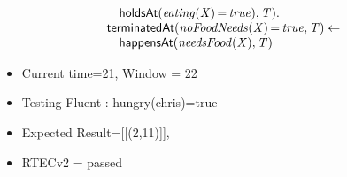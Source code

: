 \documentclass[8pt]{beamer}
\DeclareMathOperator{\val}{=}  %
\def \patsize {}
\def\happensAt{\textsf{\patsize happensAt}}
\def\holdsAt{\textsf{\patsize holdsAt}}
\def\terminatedAt{\textsf{\patsize terminatedAt}}
\newenvironment{mysplit}%
  {\arraycolsep 0pt \begin{array}{l}}%
  {\end{array}}
\begin{document}
\begin{frame}
\begin{minipage}{0.55\linewidth}
\begin{align*}
\begin{mysplit}
                \quad    \holdsAt\mathit{(eating(X)\val true),T).}\\
                \terminatedAt\mathit{(noFoodNeeds(X)\val true,T)\leftarrow}\\
                \quad    \happensAt\mathit{(needsFood(X),T)}\\
            \end{mysplit}
        \end{align*}
    \end{minipage}
    \begin{itemize}
        \item Current time=21, Window = 22
        \item Testing Fluent :  hungry(chris)=true
        \item Expected Result=[[(2,11)]],
        \item RTECv2 = passed
    \end{itemize}
\end{frame}
\end{document}
